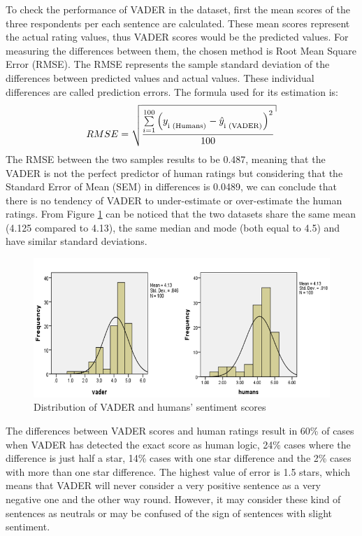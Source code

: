 To check the performance of VADER in the dataset, first the mean scores of the three respondents per each sentence are calculated. These mean scores represent the actual rating values, thus VADER scores would  be the predicted values.  For measuring the differences between them, the chosen method is Root Mean Square Error (RMSE).  The RMSE represents the sample standard deviation of the differences between predicted values and actual values. These individual differences are called prediction errors. The formula used for its estimation is:
\begin{equation}
 RMSE = \sqrt {{\frac{{\sum\limits_{{i = 1}}^{100} {{{\left( {{y_\textsubscript{i (Humans)}} - {{\hat{y}}_\textsubscript{i (VADER)}}} \right)}^2}} }}{{100}}}}
 \label{RMSE}
\end{equation}
The RMSE between the two samples results to be 0.487, meaning that the VADER is not the perfect predictor of human ratings but considering that the Standard Error of Mean (SEM) in differences is 0.0489, we can conclude that there is no tendency of VADER to under-estimate or over-estimate the human ratings. From Figure \ref{fig:distribution} can be noticed that the two datasets share the same mean (4.125 compared to 4.13), the same median and mode (both equal to 4.5) and have similar standard deviations. 
\begin{figure}[h!]
	\centering
	\includegraphics[height=0.33\textheight]{graphs_vader_humans}
	\caption{Distribution of VADER and humans' sentiment scores}
	\label{fig:distribution}
\end{figure}

The differences between VADER scores and human ratings result in 60\% of cases when VADER has detected the exact score as human logic, 24\% cases where the difference is just half a star, 14\% cases with one star difference and the 2\% cases with more than one star difference. The highest value of error is 1.5 stars, which means that VADER will never consider a very positive sentence as a very negative one and the other way round. However, it may consider these kind of sentences as neutrals or may be confused of the sign of sentences with slight sentiment.

